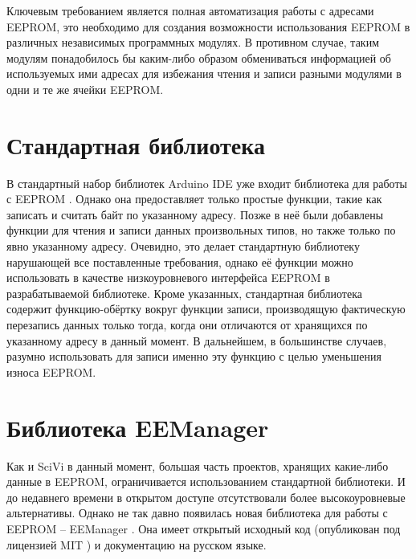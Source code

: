 Ключевым требованием является полная автоматизация работы с адресами EEPROM, это необходимо для создания возможности использования EEPROM в различных независимых программных модулях.
В противном случае, таким модулям понадобилось бы каким-либо образом обмениваться информацией об используемых ими адресах для избежания чтения и записи разными модулями в одни и те же ячейки EEPROM.


\section{Стандартная библиотека}

В стандартный набор библиотек Arduino IDE уже входит библиотека для работы с EEPROM \cite{web:arduino-eeprom}.
Однако она предоставляет только простые функции, такие как записать и считать байт по указанному адресу.
Позже в неё были добавлены функции для чтения и записи данных произвольных типов, но также только по явно указанному адресу.
Очевидно, это делает стандартную библиотеку нарушающей все поставленные требования, однако её функции можно использовать в качестве низкоуровневого интерфейса EEPROM в разрабатываемой библиотеке.
Кроме указанных, стандартная библиотека содержит функцию-обёртку вокруг функции записи, производящую фактическую перезапись данных только тогда, когда они отличаются от хранящихся по указанному адресу в данный момент.
В дальнейшем, в большинстве случаев, разумно использовать для записи именно эту функцию с целью уменьшения износа EEPROM.


\section{Библиотека EEManager} \label{section:eemanager}

Как и SciVi в данный момент, большая часть проектов, хранящих какие-либо данные в EEPROM, ограничивается использованием стандартной библиотеки.
И до недавнего времени в открытом доступе отсутствовали более высокоуровневые альтернативы.
Однако не так давно появилась новая библиотека для работы с EEPROM -- EEManager \cite{web:eemanager}.
Она имеет открытый исходный код (опубликован под лицензией MIT \cite{web:MIT}) и документацию на русском языке.

